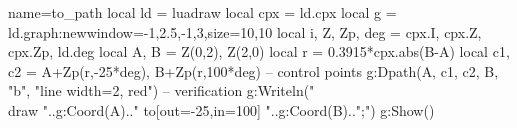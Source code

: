 \documentclass{standalone}
\begin{document}
\begin{luadraw}{name=to_path}
local ld = luadraw
local cpx = ld.cpx
local g = ld.graph:new{window={-1,2.5,-1,3},size={10,10}}
local i, Z, Zp, deg = cpx.I, cpx.Z, cpx.Zp, ld.deg
local A, B = Z(0,2), Z(2,0)
local r = 0.3915*cpx.abs(B-A)
local c1, c2 = A+Zp(r,-25*deg), B+Zp(r,100*deg) -- control points
g:Dpath({A, c1, c2, B, "b"}, "line width=2, red")
-- verification
g:Writeln("\\draw "..g:Coord(A).." to[out=-25,in=100] "..g:Coord(B)..";")
g:Show()
\end{luadraw}
\end{document}
